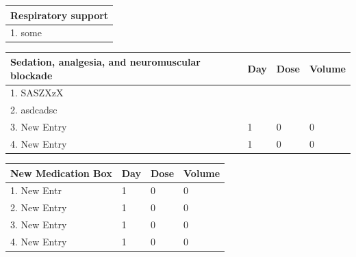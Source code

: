 \documentclass{article}
\begin{document}
\begin{minipage}[t]{0.45\textwidth}
\vspace{-2.73cm} %

    

    \begin{tabular}{|p{12cm}|}
        \hline
        \textbf{Respiratory support} \\
        \hline
       1. some \\
        \hline
    \end{tabular}
    \vspace{0.2cm}

    \begin{tabular}{|p{7cm}|p{1cm}|p{2cm}|p{2cm}|}
        \hline
        \textbf{Sedation, analgesia, and neuromuscular blockade} & \textbf{Day} & \textbf{Dose} & \textbf{Volume} \\
        \hline
       1. SASZXzX &  &  &  \\
        \hline
       2. asdcadsc &  &  &  \\
        \hline
       3. New Entry & 1 & 0 & 0 \\
        \hline
       4. New Entry & 1 & 0 & 0 \\
        \hline
    \end{tabular}
    \vspace{0.2cm}

    \begin{tabular}{|p{7cm}|p{1cm}|p{2cm}|p{2cm}|}
        \hline
        \textbf{New Medication Box} & \textbf{Day} & \textbf{Dose} & \textbf{Volume} \\
        \hline
       1. New Entr & 1 & 0 & 0 \\
        \hline
       2. New Entry & 1 & 0 & 0 \\
        \hline
       3. New Entry & 1 & 0 & 0 \\
        \hline
       4. New Entry & 1 & 0 & 0 \\
        \hline
    \end{tabular}
    \vspace{0.2cm}

\end{minipage}%
\hfill%
\end{document}
